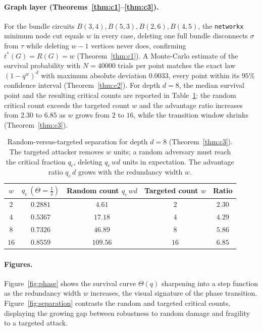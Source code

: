 \paragraph{Graph layer (Theorems~\ref{thm:c1}--\ref{thm:c3}).}
For the bundle circuits $B(3,4),B(5,3),B(2,6),B(4,5)$, the \texttt{networkx} minimum
node cut equals $w$ in every case, deleting one full bundle disconnects $\sigma$ from
$\tau$ while deleting $w-1$ vertices never does, confirming
$t^*(G)=R(G)=w$ (Theorem~\ref{thm:c1}). A Monte-Carlo estimate of the survival
probability with $N=40000$ trials per point matches the exact law $(1-q^w)^d$ with
maximum absolute deviation $0.0033$, every point within its $95\%$ confidence interval
(Theorem~\ref{thm:c2}). For depth $d=8$, the median survival point and the resulting
critical counts are reported in Table~\ref{tab:c3}: the random critical count exceeds
the targeted count $w$ and the advantage ratio increases from $2.30$ to $6.85$ as $w$
grows from $2$ to $16$, while the transition window shrinks (Theorem~\ref{thm:c3}).

\begin{table}[ht]
\centering
\caption{Random-versus-targeted separation for depth $d=8$ (Theorem~\ref{thm:c3}).
The targeted attacker removes $w$ units; a random adversary must reach the critical
fraction $q_c$, deleting $q_c\,wd$ units in expectation. The advantage ratio
$q_c\,d$ grows with the redundancy width $w$.}
\label{tab:c3}
\begin{tabular}{ccccc}
\toprule
$w$ & $q_c\ (\Theta=\tfrac12)$ & Random count $q_c\,wd$ & Targeted count $w$ & Ratio \\
\midrule
$2$  & $0.2881$ & $4.61$   & $2$  & $2.30$ \\
$4$  & $0.5367$ & $17.18$  & $4$  & $4.29$ \\
$8$  & $0.7326$ & $46.89$  & $8$  & $5.86$ \\
$16$ & $0.8559$ & $109.56$ & $16$ & $6.85$ \\
\bottomrule
\end{tabular}
\end{table}

\paragraph{Figures.}
Figure~\ref{fig:phase} shows the survival curve $\Theta(q)$ sharpening into a step
function as the redundancy width $w$ increases, the visual signature of the phase
transition. Figure~\ref{fig:separation} contrasts the random and targeted critical
counts, displaying the growing gap between robustness to random damage and fragility
to a targeted attack.

